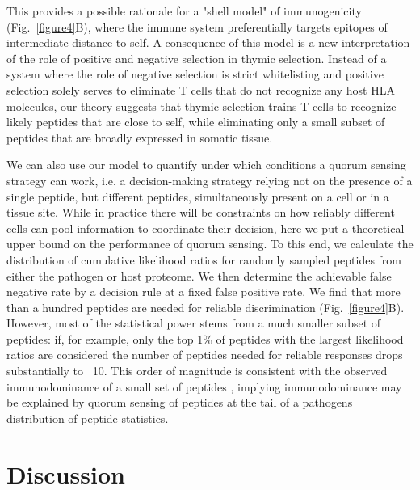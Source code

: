 \documentclass[superscriptaddress,twocolumn,pre]{revtex4}
\newcommand{\<}{\langle}
\renewcommand{\>}{\rangle}
\begin{document}
This provides a possible rationale for a "shell model" of immunogenicity (Fig.~\ref{figure4}B), where the immune system preferentially targets epitopes of intermediate distance to self. A consequence of this model is a new interpretation of the role of positive and negative selection in thymic selection. Instead of a system where the role of negative selection is strict whitelisting and positive selection solely serves to eliminate T cells that do not recognize any host HLA molecules, our theory suggests that thymic selection trains T cells to recognize likely peptides that are close to self, while eliminating only a small subset of peptides that are broadly expressed in somatic tissue.

We can also use our model to quantify under which conditions a quorum sensing strategy can work, i.e. a decision-making strategy relying not on the presence of a single peptide, but  different peptides, simultaneously present on a cell or in a tissue site. While in practice there will be constraints on how reliably different cells can pool information to coordinate their decision, here we put a theoretical upper bound on the performance of quorum sensing. To this end, we calculate the distribution of cumulative likelihood ratios for  randomly sampled peptides from either the pathogen or host proteome. We then determine the achievable false negative rate by a decision rule at a fixed false positive rate. We find that more than a hundred peptides are needed for reliable discrimination (Fig.~\ref{figure4}B). However, most of the statistical power stems from a much smaller subset of peptides: if, for example, only the top 1\% of peptides with the largest likelihood ratios are considered the number of peptides needed for reliable responses drops substantially to ~10. This order of magnitude is consistent with the observed immunodominance of a small set of peptides \cite{REF NEEDED}, implying immunodominance may be explained by quorum sensing of peptides at the tail of a pathogens distribution of peptide statistics.

\section{Discussion}
\end{document}
